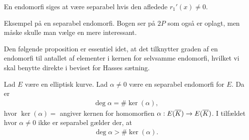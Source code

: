 En endomorfi siges at være separabel hvis den afledede $r_1'(x) \neq 0$.

\begin{example}
Eksempel på en separabel endomorfi. Bogen ser på $2P$ som også er oplagt, men måske skulle man vælge en mere interessant.
\end{example}

Den følgende proposition er essentiel idet, at det tilknytter graden af en endomorfi til antallet af elementer i kernen for selvsamme endomorfi, hvilket vi skal benytte direkte i beviset for Hasses sætning.

\begin{proposition}
\label{deg_to_ker}
Lad $E$ være en elliptisk kurve. Lad $\alpha \neq 0$ være en separabel 
endomorfi for $E$. Da er 
\begin{align*}
	\deg \alpha = \# \ker (\alpha),
\end{align*}
hvor $\ker (\alpha) = $ angiver kernen for homomorfien 
$\alpha : E(\overline{K}) \to E(\overline{K})$. I tilfældet hvor $\alpha \neq 0$ ikke
er separabel gælder der, at 
\begin{align*}
	\deg \alpha > \# \ker (\alpha).
\end{align*}
\end{proposition}
